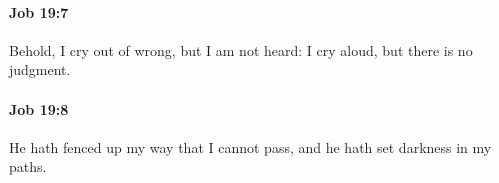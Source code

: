 		\paragraph{Job 19:7} %
			\label{JOB-19-7}

			Behold, I cry out of wrong, but I am not heard: I cry aloud, but there is no judgment.


		\paragraph{Job 19:8} %
			\label{JOB-19-8}

			He hath fenced up my way that I cannot pass, and he hath set darkness in my paths.


